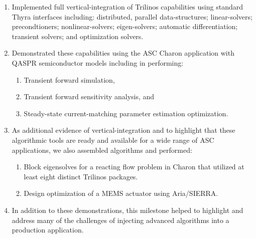 \documentclass[pdf,ps2pdf,11pt]{SANDreport}
\begin{document}
\begin{enumerate}

{}\item Implemented full vertical-integration of Trilinos capabilities using
standard Thyra interfaces including: distributed, parallel data-structures;
linear-solvers; precondtioners; nonlinear-solvers; eigen-solvers; automatic
differentiation; transient solvers; and optimization solvers.

{}\item Demonstrated these capabilities using the ASC Charon application with
QASPR semiconductor models including in performing:

  \begin{enumerate}
  
  {}\item Transient forward simulation,
  
  {}\item Transient forward sensitivity analysis, and
  
  {}\item Steady-state current-matching parameter estimation optimization.
  
  \end{enumerate}
  
{}\item As additional evidence of vertical-integration and to highlight that
these algorithmic tools are ready and available for a wide range of ASC
applications, we also assembled algorithms and performed:
  
  \begin{enumerate}
  
  {}\item Block eigensolves for a reacting flow problem in Charon that
  utilized at least eight distinct Trilinos packages.
  
  {}\item Design optimization of a MEMS actuator using Aria/SIERRA.
  
  \end{enumerate}
  
{}\item In addition to these demonstrations, this milestone helped to highlight
and address many of the challenges of injecting advanced algorithms into a
production application.

\end{enumerate}

\end{document}
